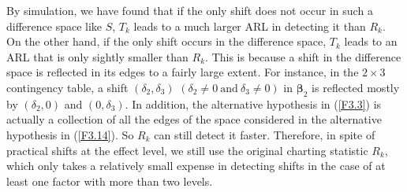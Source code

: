 By simulation, we have found that if the only shift does not occur in such a
difference space like $S$, $T_k$ leads to a much larger ARL in detecting it than
$R_k$. On the other hand, if the only shift occurs in the difference space, $T_k$
leads to an ARL that is only sightly smaller than $R_k$. This is because a shift in
the difference space is reflected in its edges to a fairly large extent. For
instance, in the $2\times 3$ contingency table, a shift $(\delta_2,\delta_3)$
$(\delta_2\neq 0\ \mathrm{and}\ \delta_3\neq 0)$ in $\bm\beta_2$ is reflected mostly
by $(\delta_2,0)$ and $(0,\delta_3)$. In addition, the alternative hypothesis in
(\ref{F3.3}) is actually a collection of all the edges of the space considered in
the alternative hypothesis in (\ref{F3.14}). So $R_k$ can still detect it faster.
Therefore, in spite of practical shifts at the effect level, we still use the
original charting statistic $R_k$, which only takes a relatively small expense in
detecting shifts in the case of at least one factor with more than two levels.
